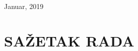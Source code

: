 \documentclass[12pt]{article}
\begin{document}
\begin{titlepage}

\vfill %

{\large Januar, 2019}\\[1cm] %

\end{titlepage}
\section*{SAŽETAK RADA}
\end{document}
